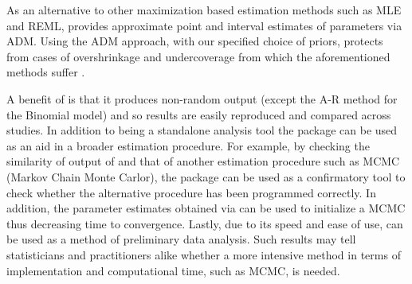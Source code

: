 \documentclass[article]{jss}
\begin{document}
As an alternative to other maximization based estimation methods such as MLE and REML,  provides approximate point and interval estimates of parameters via ADM. Using the ADM approach, with our specified choice of priors, protects from cases of overshrinkage and undercoverage from which the aforementioned methods suffer  \citep{accuracy1988}.


A benefit of  is that it produces non-random output (except the A-R method for the Binomial model) and so results are easily reproduced and compared across studies. In addition to being a standalone analysis tool the package can be used as an aid in a broader estimation procedure. For example, by checking the similarity of output of  and that of another estimation procedure such as MCMC (Markov Chain Monte Carlor), the package can be used as a confirmatory tool to check whether the alternative procedure has been programmed correctly. In addition, the parameter estimates obtained via  can be used to initialize a MCMC thus decreasing time to convergence. Lastly, due to its speed and ease of use,  can be used as a method of preliminary data analysis. Such results may tell statisticians and practitioners alike whether a more intensive method in terms of implementation and computational time, such as MCMC, is needed. 



\appendix
\end{document}

